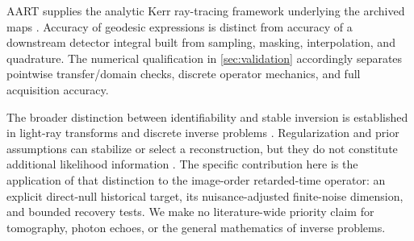 AART supplies the analytic Kerr ray-tracing framework underlying the archived maps \cite{aart}. Accuracy of geodesic expressions is distinct from accuracy of a downstream detector integral built from sampling, masking, interpolation, and quadrature. The numerical qualification in \cref{sec:validation} accordingly separates pointwise transfer/domain checks, discrete operator mechanics, and full acquisition accuracy.

The broader distinction between identifiability and stable inversion is established in light-ray transforms and discrete inverse problems \cite{lassas,hansen}. Regularization and prior assumptions can stabilize or select a reconstruction, but they do not constitute additional likelihood information \cite{stuart}. The specific contribution here is the application of that distinction to the image-order retarded-time operator: an explicit direct-null historical target, its nuisance-adjusted finite-noise dimension, and bounded recovery tests. We make no literature-wide priority claim for tomography, photon echoes, or the general mathematics of inverse problems.

